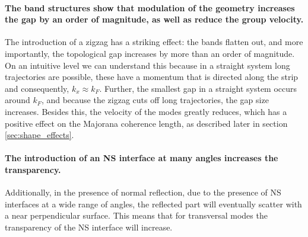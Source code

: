 \documentclass[english, twocolumn, 10pt, aps, superscriptaddress, floatfix, prb, citeautoscript]{revtex4-1}
\renewcommand{\comment}[2]{#2}
\renewcommand{\comment}{\paragraph}
\begin{document}
\comment{The band structures show that modulation of the geometry increases the gap by an order of magnitude, as well as reduce the group velocity.}
The introduction of a zigzag has a striking effect: the bands flatten out, and more importantly, the topological gap increases by more than an order of magnitude.
On an intuitive level we can understand this because in a straight system long trajectories are possible, these have a momentum that is directed along the strip and consequently, $k_x \approx k_F$.
Further, the smallest gap in a straight system occurs around $k_F$, and because the zigzag cuts off long trajectories, the gap size increases.
Besides this, the velocity of the modes greatly reduces, which has a positive effect on the Majorana coherence length, as described later in section \ref{sec:shape_effects}.

\comment{The introduction of an NS interface at many angles increases the transparency.}
Additionally, in the presence of normal reflection, due to the presence of NS interfaces at a wide range of angles, the reflected part will eventually scatter with a near perpendicular surface.
This means that for transversal modes the transparency of the NS interface will increase.





\end{document}
